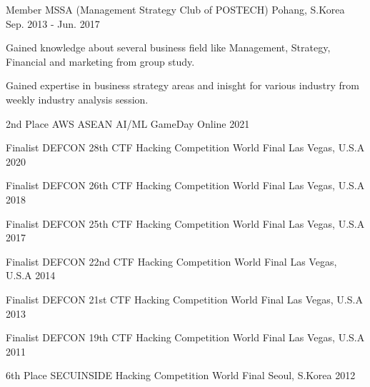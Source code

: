 \documentclass[11pt, a4paper]{../awesome-cv}
\begin{document}
\begin{cventries}
\cventry
    {Member} {MSSA (Management Strategy Club of POSTECH)} {Pohang, S.Korea} {Sep. 2013 - Jun. 2017} {
      \begin{cvitems} \item {Gained knowledge about several business field like Management, Strategy, Financial and marketing from group study.}
        \item {Gained expertise in business strategy areas and inisght for various industry from weekly industry analysis session.}
      \end{cvitems}
    }

\end{cventries}




\begin{cvhonors}

\cvhonor
    {2nd Place} {AWS ASEAN AI/ML GameDay} {Online} {2021} 

\cvhonor
    {Finalist} {DEFCON 28th CTF Hacking Competition World Final} {Las Vegas, U.S.A} {2020} 

\cvhonor
    {Finalist} {DEFCON 26th CTF Hacking Competition World Final} {Las Vegas, U.S.A} {2018} 

\cvhonor
    {Finalist} {DEFCON 25th CTF Hacking Competition World Final} {Las Vegas, U.S.A} {2017} 

\cvhonor
    {Finalist} {DEFCON 22nd CTF Hacking Competition World Final} {Las Vegas, U.S.A} {2014} 

\cvhonor
    {Finalist} {DEFCON 21st CTF Hacking Competition World Final} {Las Vegas, U.S.A} {2013} 

\cvhonor
    {Finalist} {DEFCON 19th CTF Hacking Competition World Final} {Las Vegas, U.S.A} {2011} 

\cvhonor
    {6th Place} {SECUINSIDE Hacking Competition World Final} {Seoul, S.Korea} {2012} 

\end{cvhonors}


\end{document}
